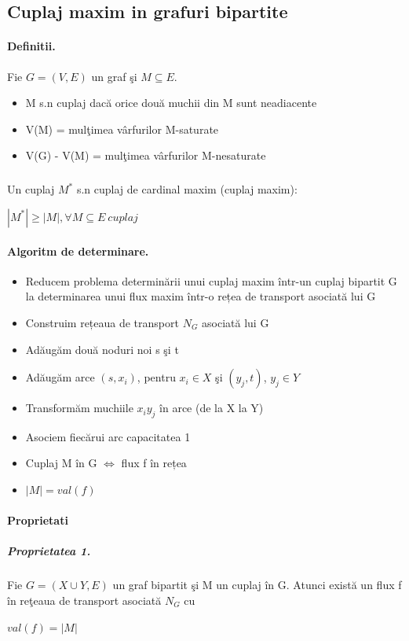 \documentclass{article}
\begin{document}
\subsection*{Cuplaj maxim in grafuri bipartite}
\paragraph*{Definitii.} Fie $G = (V, E)$ un graf şi $M \subseteq E$.
\begin{itemize}
    \item M s.n cuplaj dacă orice două muchii din M sunt neadiacente
    \item V(M) = mulţimea vârfurilor M-saturate
    \item V(G) - V(M) = mulţimea vârfurilor M-nesaturate
\end{itemize}

\subparagraph*{} Un cuplaj $M^*$ s.n cuplaj de cardinal maxim (cuplaj maxim):
\begin{center}
    $| M^*| \geq |M|,  \forall M \subseteq E\ cuplaj$
\end{center}

\paragraph*{Algoritm de determinare.}
\begin{itemize}
    \item Reducem problema determinării unui cuplaj maxim într-un cuplaj bipartit G la determinarea unui flux maxim într-o rețea de transport asociată lui G
    \item Construim rețeaua de transport $N_G$ asociată lui G
    \item Adăugăm două noduri noi s şi t
    \item Adăugăm arce $(s,x_i)$, pentru $x_i \in X$ şi $(y_j, t)$, $y_j \in Y$
    \item Transformăm muchiile $x_iy_j$ în arce (de la X la Y)
    \item Asociem fiecărui arc capacitatea 1
    \item Cuplaj M în G $\Leftrightarrow$ flux f în rețea
    \item $|M|=val(f)$
\end{itemize}

\paragraph*{Proprietati}
\subparagraph*{Proprietatea 1.} Fie $G=(X \cup Y, E)$ un graf bipartit şi M un cuplaj în G. Atunci există un flux f în reţeaua de transport asociată $N_G$ cu
\begin{center}
    $val(f) = |M|$
\end{center}
\end{document}
